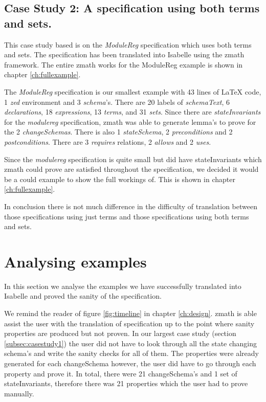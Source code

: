 \subsection{Case Study 2: A specification using both terms and sets.}

This case study based is on the \emph{ModuleReg} specification which uses both
terms and sets. The specification has been translated into Isabelle using the
\gls{zmath} framework. The entire \gls{zmath} works for the ModuleReg example is
shown in chapter \ref{ch:fullexample}.

The \emph{ModuleReg} specification is our smallest example with 43 lines of
\LaTeX{} code, 1 \emph{zed} environment and 3 \emph{schema}'s. There are 20
labels of \emph{schemaText}, 6 \emph{declarations}, 18 \emph{expressions}, 13
\emph{terms}, and 31 \emph{sets}. Since there are \emph{stateInvariants} for the
\emph{modulereg} specification, \gls{zmath} was able to generate lemma's to
prove for the 2 \emph{changeSchemas}. There is also 1 \emph{stateSchema}, 2
\emph{preconditions} and 2 \emph{postconditions}. There are 3 \emph{requires}
relations, 2 \emph{allows} and 2 \emph{uses}.

Since the \emph{modulereg} specification is quite small but did have
stateInvariants which \gls{zmath} could prove are satisfied throughout the
specification, we decided it would be a could example to show the full workings
of. This is shown in chapter \ref{ch:fullexample}.

In conclusion there is not much difference in the difficulty of translation
between those specifications using just terms and those specifications using
both terms and sets.

\section{Analysing examples}

In this section we analyse the examples we have successfully translated into
Isabelle and proved the sanity of the specification. 

We remind the reader of figure \ref{fig:timeline} in chapter \ref{ch:design}.
\Gls{zmath} is able assist the user with the translation of specification up to
the point where sanity properties are produced but not proven. In our largest
case study (section \ref{subsec:casestudy1}) the user did not have to look
through all the state changing schema's and write the sanity checks for all of
them. The properties were already generated for each changeSchema however, the
user did have to go through each property and prove it. In total, there were 21
changeSchema's and 1 set of stateInvariants, therefore there was 21 properties
which the user had to prove manually.


